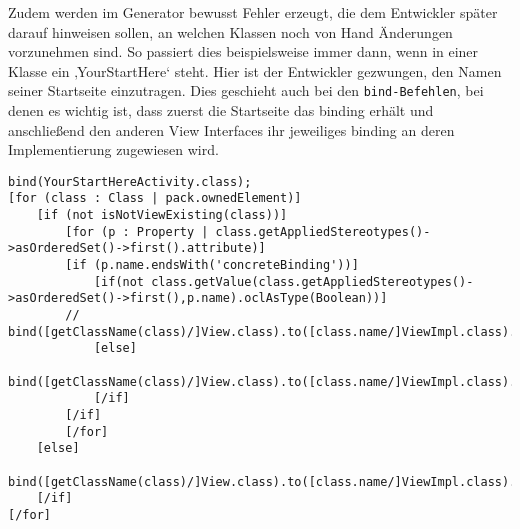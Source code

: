 Zudem werden im Generator bewusst Fehler erzeugt, die dem Entwickler später darauf hinweisen sollen, an welchen Klassen noch von Hand Änderungen vorzunehmen sind. So passiert dies beispielsweise immer dann, wenn in einer Klasse ein ‚YourStartHere‘ steht. Hier ist der Entwickler gezwungen, den Namen seiner Startseite einzutragen. Dies geschieht auch bei den \texttt{bind-Befehlen}, bei denen es wichtig ist, dass zuerst die Startseite das binding erhält und anschließend den anderen View Interfaces ihr jeweiliges binding an deren Implementierung zugewiesen wird.
\lstset{language=OCL}
\begin{lstlisting}[caption={Auszug aus der Generierung des bind-Befehls}, label={BSPCodeBind}]
bind(YourStartHereActivity.class);   
[for (class : Class | pack.ownedElement)]
	[if (not isNotViewExisting(class))]
		[for (p : Property | class.getAppliedStereotypes()->asOrderedSet()->first().attribute)]
		[if (p.name.endsWith('concreteBinding'))]
			[if(not class.getValue(class.getAppliedStereotypes()->asOrderedSet()->first(),p.name).oclAsType(Boolean))]
		// bind([getClassName(class)/]View.class).to([class.name/]ViewImpl.class).in(Singleton.class);
			[else]
		bind([getClassName(class)/]View.class).to([class.name/]ViewImpl.class).in(Singleton.class);
			[/if]
		[/if]
		[/for]
	[else]
		bind([getClassName(class)/]View.class).to([class.name/]ViewImpl.class).in(Singleton.class);
	[/if]	
[/for]
\end{lstlisting}

